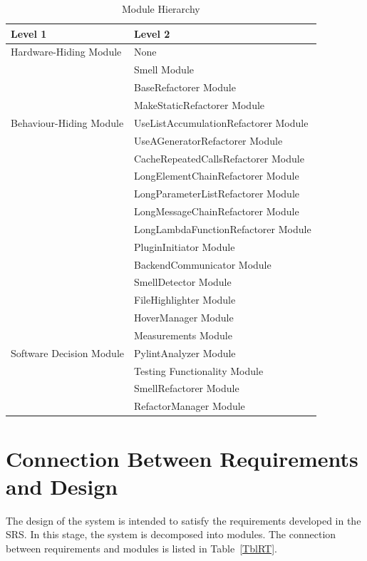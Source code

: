 \documentclass[12pt, titlepage]{article}
\begin{document}
\begin{table}[h!]
\centering
\begin{tabular}{p{} p{}}
\toprule
\textbf{Level 1} & \textbf{Level 2}\\
\midrule

{Hardware-Hiding Module} & None \\
\midrule

\multirow{7}{0.3\textwidth}{Behaviour-Hiding Module} & Smell Module\\
& BaseRefactorer Module\\
& MakeStaticRefactorer Module\\
& UseListAccumulationRefactorer Module\\
& UseAGeneratorRefactorer Module\\
& CacheRepeatedCallsRefactorer Module\\
& LongElementChainRefactorer Module\\
& LongParameterListRefactorer Module\\
& LongMessageChainRefactorer Module\\
& LongLambdaFunctionRefactorer Module\\ 
& PluginInitiator Module\\
& BackendCommunicator Module\\ 
& SmellDetector Module\\
& FileHighlighter Module\\
& HoverManager Module\\
\midrule


\multirow{3}{0.3\textwidth}{Software Decision Module} & Measurements Module\\
& PylintAnalyzer Module\\
& Testing Functionality Module\\
& SmellRefactorer Module\\
& RefactorManager Module\\
\bottomrule

\end{tabular}
\caption{Module Hierarchy}
\label{TblMH}
\end{table}

\section{Connection Between Requirements and Design} \label{SecConnection}

The design of the system is intended to satisfy the requirements developed in
the SRS. In this stage, the system is decomposed into modules. The connection
between requirements and modules is listed in Table~\ref{TblRT}.
\end{document}
